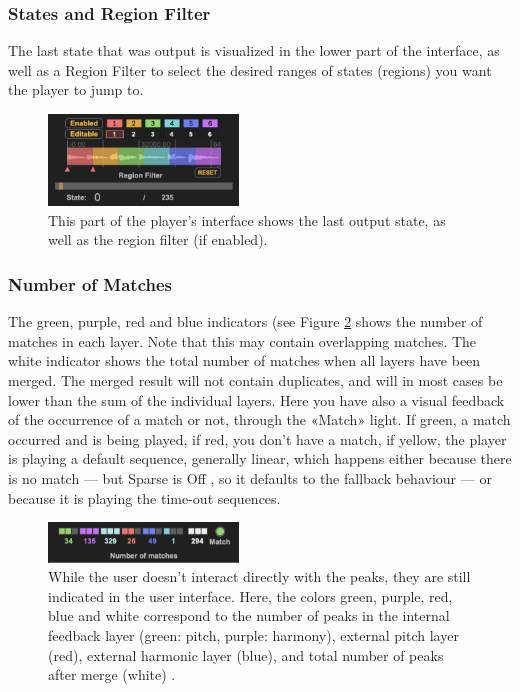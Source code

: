 \subsubsection{States and Region Filter} 
The last state that was output is visualized in the lower part of the interface, as well as a Region Filter to select the desired ranges of states (regions) you want the player to jump to. 

 \begin{figure}[h!]
    \centering        
 	\includegraphics[width=0.45\textwidth]{img/region_filter.png}
    \caption{This part of the player's interface shows the last output state, as well as the region filter (if enabled).}
    \label{fig:state}
\end{figure}

\subsubsection{Number of Matches}
The green, purple, red and blue indicators (see Figure \ref{fig:peaks} shows the number of matches in each layer. Note that this may contain overlapping matches. The white indicator shows the total number of matches when all layers have been merged. The merged result will not contain duplicates, and will in most cases be lower than the sum of the individual layers. Here you have also a visual feedback of the occurrence of a match or not, through the «Match» light. If green, a match occurred and is being played, if red, you don't have a match, if yellow, the player is playing a default sequence, generally linear, which happens either because there is no match — but Sparse is Off , so it defaults to the fallback behaviour — or because it is playing the time-out sequences.

 \begin{figure}[h!]
    \centering        
 	\includegraphics[width=0.45\textwidth]{img/matches.png}
    \caption{While the user doesn't interact directly with the peaks, they are still indicated in the user interface.    Here, the colors green, purple, red, blue and white correspond to the number of peaks in the internal feedback layer (green: pitch, purple: harmony), external pitch layer (red), external harmonic layer (blue), and total number of peaks after merge (white) .}
    \label{fig:peaks}
\end{figure}



